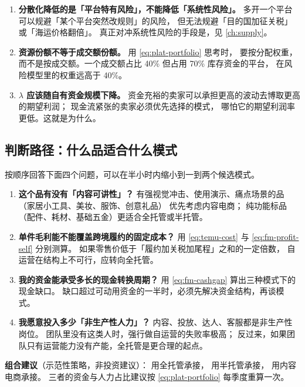 \begin{enumerate}
  \item \textbf{分散化降低的是「平台特有风险」，不能降低「系统性风险」。}
        多开一个平台可以规避「某个平台突然改规则」的风险，
        但无法规避「目的国加征关税」或「海运价格翻倍」。
        真正对冲系统性风险的手段是，见 \cref{ch:supply}。
  \item \textbf{资源份额不等于成交额份额。} 用 \cref{eq:plat-portfolio} 思考时，
        要按分配权重，
        而不是按成交额。一个成交额占比 40\% 但占用 70\% 库存资金的平台，
        在风险模型里的权重远高于 40\%。
  \item \textbf{$\lambda$ 应该随自有资金规模下降。}
        资金充裕的卖家可以承担更高的波动去博取更高的期望利润；
        现金流紧张的卖家必须优先选择的模式，
        哪怕它的期望利润率更低。这就是为什么。
\end{enumerate}

\subsection{判断路径：什么品适合什么模式}

\begin{toolbox}[模式选择的四步判断路径]
按顺序回答下面四个问题，可以在半小时内缩小到一到两个候选模式。
\begin{enumerate}
  \item \textbf{这个品有没有「内容可讲性」？}
        有强视觉冲击、使用演示、痛点场景的品（家居小工具、美妆、服饰、创意礼品）
        优先考虑内容电商；
        纯功能标品（配件、耗材、基础五金）更适合全托管或半托管。
  \item \textbf{单件毛利能不能覆盖跨境履约的固定成本？}
        用 \cref{eq:temu-cost} 与 \cref{eq:fm-profit-self} 分别测算。
        如果零售价低于「履约加关税加尾程」之和的一定倍数，
        自运营在结构上不可行，应转向全托管。
  \item \textbf{我的资金能承受多长的现金转换周期？}
        用 \cref{eq:fm-cashgap} 算出三种模式下的现金缺口。
        缺口超过可动用资金的一半时，必须先解决资金结构，再谈模式。
  \item \textbf{我愿意投入多少「非生产性人力」？}
        内容、投放、达人、客服都是非生产性岗位。
        团队里没有这类人时，强行做自运营的失败率极高；
        反过来，如果团队只有运营能力没有产能，全托管是更合理的起点。
\end{enumerate}
\textbf{组合建议}（示范性策略，非投资建议）：
用全托管承接，
用半托管承接，
用内容电商承接。
三者的资金与人力占比建议按 \cref{eq:plat-portfolio} 每季度重算一次。
\end{toolbox}

